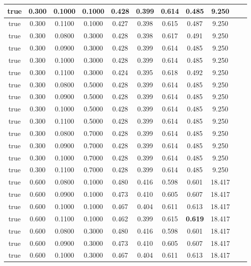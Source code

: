 \begin{longtable}[c]{|c|c|c|c|c|c|c|c|c|c|c|}
 true & 0.300 & 0.1000 & 0.1000 & 0.428 & 0.399 & 0.614 & 0.485 & 9.250  \\ \hline 
 true & 0.300 & 0.1100 & 0.1000 & 0.427 & 0.398 & 0.615 & 0.487 & 9.250  \\ \hline 
 true & 0.300 & 0.0800 & 0.3000 & 0.428 & 0.398 & 0.617 & 0.491 & 9.250  \\ \hline 
 true & 0.300 & 0.0900 & 0.3000 & 0.428 & 0.399 & 0.614 & 0.485 & 9.250  \\ \hline 
 true & 0.300 & 0.1000 & 0.3000 & 0.428 & 0.399 & 0.614 & 0.485 & 9.250  \\ \hline 
 true & 0.300 & 0.1100 & 0.3000 & 0.424 & 0.395 & 0.618 & 0.492 & 9.250  \\ \hline 
 true & 0.300 & 0.0800 & 0.5000 & 0.428 & 0.399 & 0.614 & 0.485 & 9.250  \\ \hline 
 true & 0.300 & 0.0900 & 0.5000 & 0.428 & 0.399 & 0.614 & 0.485 & 9.250  \\ \hline 
 true & 0.300 & 0.1000 & 0.5000 & 0.428 & 0.399 & 0.614 & 0.485 & 9.250  \\ \hline 
 true & 0.300 & 0.1100 & 0.5000 & 0.428 & 0.399 & 0.614 & 0.485 & 9.250  \\ \hline 
 true & 0.300 & 0.0800 & 0.7000 & 0.428 & 0.399 & 0.614 & 0.485 & 9.250  \\ \hline 
 true & 0.300 & 0.0900 & 0.7000 & 0.428 & 0.399 & 0.614 & 0.485 & 9.250  \\ \hline 
 true & 0.300 & 0.1000 & 0.7000 & 0.428 & 0.399 & 0.614 & 0.485 & 9.250  \\ \hline 
 true & 0.300 & 0.1100 & 0.7000 & 0.428 & 0.399 & 0.614 & 0.485 & 9.250  \\ \hline 
 true & 0.600 & 0.0800 & 0.1000 & 0.480 & 0.416 & 0.598 & 0.601 & 18.417  \\ \hline 
 true & 0.600 & 0.0900 & 0.1000 & 0.473 & 0.410 & 0.605 & 0.607 & 18.417  \\ \hline 
 true & 0.600 & 0.1000 & 0.1000 & 0.467 & 0.404 & 0.611 & 0.613 & 18.417  \\ \hline 
 true & 0.600 & 0.1100 & 0.1000 & 0.462 & 0.399 & 0.615 & \cellcolor{gray!20} \textbf{0.619} & 18.417  \\ \hline 
 true & 0.600 & 0.0800 & 0.3000 & 0.480 & 0.416 & 0.598 & 0.601 & 18.417  \\ \hline 
 true & 0.600 & 0.0900 & 0.3000 & 0.473 & 0.410 & 0.605 & 0.607 & 18.417  \\ \hline 
 true & 0.600 & 0.1000 & 0.3000 & 0.467 & 0.404 & 0.611 & 0.613 & 18.417  \\ \hline 

\end{longtable}

